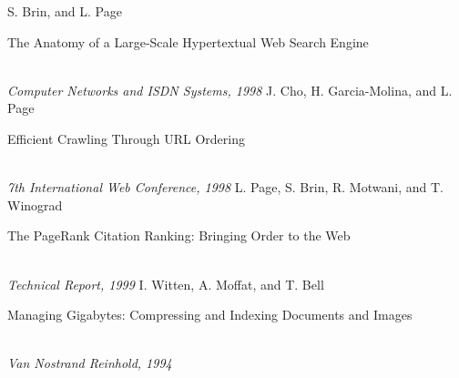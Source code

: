 \documentclass[10pt]{beamer}
\begin{document}
\begin{frame}
  \begin{thebibliography}{1}
      S. Brin, and L. Page\\
      \begin{bf} The Anatomy of a Large-Scale Hypertextual Web Search Engine \end{bf}\\
      \emph{Computer Networks and ISDN Systems, 1998}
      J. Cho, H. Garcia-Molina, and L. Page\\
      \begin{bf} Efficient Crawling Through URL Ordering \end{bf}\\
      \emph{7th International Web Conference, 1998}
      L. Page, S. Brin, R. Motwani, and T. Winograd\\
      \begin{bf} The PageRank Citation Ranking: Bringing Order to the Web \end{bf}\\
      \emph{Technical Report, 1999}
      I. Witten, A. Moffat, and T. Bell\\
      \begin{bf} Managing Gigabytes: Compressing and Indexing Documents and Images \end{bf}\\
      \emph{Van Nostrand Reinhold, 1994}
  \end{thebibliography}
\end{frame}
\end{document}
